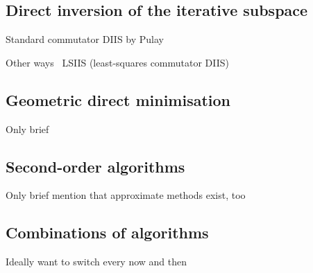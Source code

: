 \subsection{Direct inversion of the iterative subspace}

Standard commutator DIIS by Pulay

Other ways~\cite{Shepard2007}
LSIIS (least-squares commutator DIIS)~\cite{Li2016}

\subsection{Geometric direct minimisation}
Only brief

\subsection{Second-order \SCF algorithms}
Only brief
mention that approximate methods exist, too

\subsection{Combinations of algorithms}
Ideally want to switch every now and then

